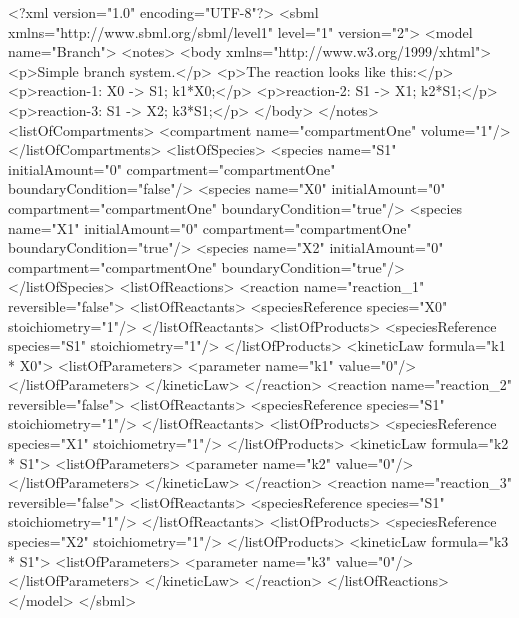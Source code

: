 \documentclass[10pt]{cekarticle}
\newcommand{\changed}[1]{\textcolor{BrickRed}{#1}}
\begin{document}
\begin{example}
<?xml version="1.0" encoding="UTF-8"?>
<sbml xmlns="http://www.sbml.org/sbml/level1"
      level="1" version="2">
    <model name="Branch">
        <notes>
            <body xmlns="http://www.w3.org/1999/xhtml">
                <p>Simple branch system.</p>
                <p>The reaction looks like this:</p>
                <p>reaction-1:   X0 -> S1; k1*X0;</p>
                <p>reaction-2:   S1 -> X1; k2*S1;</p>
                <p>reaction-3:   S1 -> X2; k3*S1;</p>
            </body>
        </notes>
        <listOfCompartments>
            <compartment name="compartmentOne" volume="1"/>
        </listOfCompartments>
        <listOfSpecies>
            <\changed{species} name="S1" initialAmount="0" compartment="compartmentOne"
                     boundaryCondition="false"/>
            <\changed{species} name="X0" initialAmount="0" compartment="compartmentOne"
                     boundaryCondition="true"/>
            <\changed{species} name="X1" initialAmount="0" compartment="compartmentOne"
                     boundaryCondition="true"/>
            <\changed{species} name="X2" initialAmount="0" compartment="compartmentOne"
                     boundaryCondition="true"/>
        </listOfSpecies>
        <listOfReactions>
            <reaction name="reaction_1" reversible="false">
                <listOfReactants>
                    <\changed{speciesReference} \changed{species=}"X0" stoichiometry="1"/>
                </listOfReactants>
                <listOfProducts>
                    <\changed{speciesReference} \changed{species=}"S1" stoichiometry="1"/>
                </listOfProducts>
                <kineticLaw formula="k1 * X0">
                    <listOfParameters>
                        <parameter name="k1" value="0"/>
                    </listOfParameters>
                </kineticLaw>
            </reaction>
            <reaction name="reaction_2" reversible="false">
                <listOfReactants>
                    <\changed{speciesReference} \changed{species=}"S1" stoichiometry="1"/>
                </listOfReactants>
                <listOfProducts>
                    <\changed{speciesReference} \changed{species=}"X1" stoichiometry="1"/>
                </listOfProducts>
                <kineticLaw formula="k2 * S1">
                    <listOfParameters>
                        <parameter name="k2" value="0"/>
                    </listOfParameters>
                </kineticLaw>
            </reaction>
            <reaction name="reaction_3" reversible="false">
                <listOfReactants>
                    <\changed{speciesReference} \changed{species=}"S1" stoichiometry="1"/>
                </listOfReactants>
                <listOfProducts>
                    <\changed{speciesReference} \changed{species=}"X2" stoichiometry="1"/>
                </listOfProducts>
                <kineticLaw formula="k3 * S1">
                    <listOfParameters>
                        <parameter name="k3" value="0"/>
                    </listOfParameters>
                </kineticLaw>
            </reaction>
        </listOfReactions>
    </model>
</sbml>
\end{example}
\end{document}
